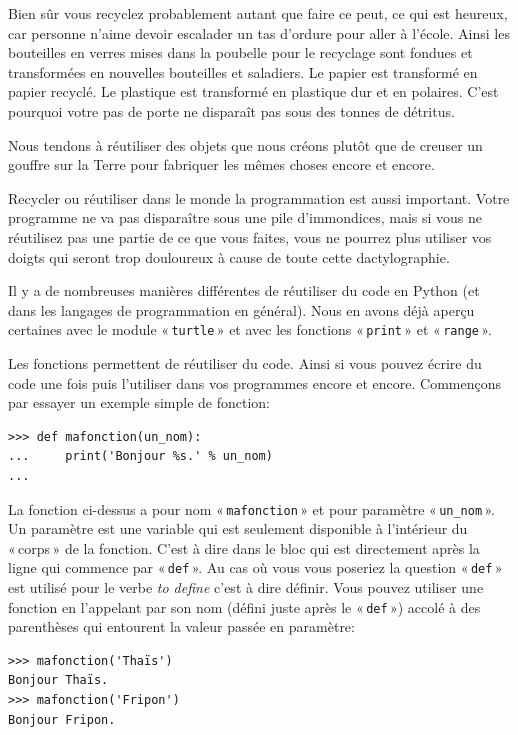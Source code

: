Bien sûr vous recyclez probablement autant que faire ce peut, ce qui est heureux, car personne n'aime devoir escalader un tas d'ordure pour aller à l'école. Ainsi les bouteilles en verres mises dans la poubelle pour le recyclage sont fondues et transformées en nouvelles bouteilles et saladiers. Le papier est transformé en papier recyclé. Le plastique est transformé en plastique dur et en polaires. C'est pourquoi votre pas de porte ne disparaît pas sous des tonnes de détritus.

Nous tendons à réutiliser des objets que nous créons plutôt que de creuser un gouffre sur la Terre pour fabriquer les mêmes choses encore et encore.

Recycler ou réutiliser dans le monde la programmation est aussi important. Votre programme ne va pas disparaître sous une pile d'immondices, mais si vous ne réutilisez pas une partie de ce que vous faites, vous ne pourrez plus utiliser vos doigts qui seront trop douloureux à cause de toute cette dactylographie.

Il y a de nombreuses manières différentes de réutiliser du code en Python (et dans les langages de programmation en général). Nous en avons déjà aperçu certaines avec le module « \texttt{turtle} » et avec les fonctions « \texttt{print} » et « \texttt{range} ».

Les fonctions permettent de réutiliser du code. Ainsi si vous pouvez écrire du code une fois puis l'utiliser dans vos programmes encore et encore. Commençons par essayer un exemple simple de fonction:

\begin{Verbatim}[frame=single,rulecolor=\color{mbleu}, label=à taper]
>>> def mafonction(un_nom):
...     print('Bonjour %s.' % un_nom)
...
\end{Verbatim}

La fonction ci-dessus a pour nom « \texttt{mafonction} » et pour paramètre « \texttt{un\_nom} ».
Un paramètre est une variable qui est seulement disponible à l'intérieur du « corps » de la fonction. 
C'est à dire dans le bloc qui est directement après la ligne qui commence par « \texttt{def} ». Au cas où vous vous poseriez la question « \texttt{def} » est utilisé pour le verbe \emph{to define} c'est à dire définir. Vous pouvez utiliser une fonction en l'appelant par son nom (défini juste après le « \texttt{def} ») accolé à des parenthèses  qui entourent la valeur passée en paramètre:

\begin{Verbatim}[frame=single,rulecolor=\color{mbleu}, label=à taper]
>>> mafonction('Thaïs')
Bonjour Thaïs.
>>> mafonction('Fripon')
Bonjour Fripon.
\end{Verbatim}

